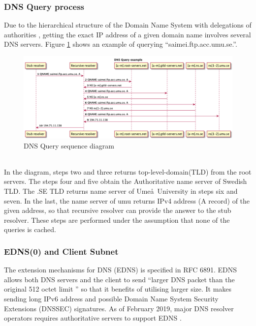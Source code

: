 \subsubsection{DNS Query process}
Due to the hierarchical structure of the Domain Name System with delegations of authorities \cite{rfc1591}, getting the exact IP address of a given domain name involves several DNS servers. Figure \ref{queryprocess} shows an example of querying ``saimei.ftp.acc.umu.se.''. 
\begin{figure}[ht!]
    \begin{center}
        \includegraphics*[width=\columnwidth]{img/dnsquery}
    \end{center}
    \caption{DNS Query sequence diagram}
    \label{queryprocess}
\end{figure}
\\
In the diagram, steps two and three returns top-level-domain(TLD) from the root servers. The steps four and five obtain the Authoritative name server of Swedish TLD. The .SE TLD returns name server of Ume\aa\ University in steps six and seven. In the last, the name server of umu returns IPv4 address (A record) of the given address, so that recursive resolver can provide the answer to the stub resolver. These steps are performed under the assumption that none of the queries is cached.

\subsubsection{EDNS(0) and Client Subnet}
The extension mechanisms for DNS (EDNS) is specified in RFC 6891.
EDNS allows both DNS servers and the client to send ``larger DNS packet than the original 512 octet limit \cite{rfc6891}'' so that it benefits of utilising larger size.
It makes sending long IPv6 address and possible Domain Name System Security Extensions (DNSSEC) signatures.
As of February 2019, major DNS resolver operators requires authoritative servers to support EDNS \cite{dns-flag-day, spacek-edns-camel-diet}. 

